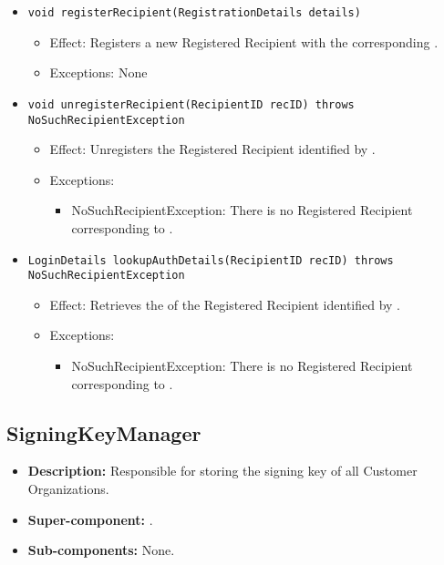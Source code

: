 \begin{itemize}
\begin{itemize}
		\item \texttt{void registerRecipient(RegistrationDetails details)}
        \begin{itemize}
            \item Effect: Registers a new Registered Recipient with the corresponding .
            \item Exceptions: None
        \end{itemize}

		\item \texttt{void unregisterRecipient(RecipientID recID) throws NoSuchRecipientException}
        \begin{itemize}
            \item Effect: Unregisters the Registered Recipient identified by .
            \item Exceptions:
			\begin{itemize}
				\item NoSuchRecipientException: There is no Registered Recipient corresponding to .
			\end{itemize}
        \end{itemize}

		\item \texttt{LoginDetails lookupAuthDetails(RecipientID recID) throws NoSuchRecipientException}
		    \begin{itemize}
                \item Effect: Retrieves the  of the Registered Recipient identified by .
                \item Exceptions:
				\begin{itemize}
					\item NoSuchRecipientException: There is no Registered Recipient corresponding to .
				\end{itemize}
            \end{itemize}
    \end{itemize}
\end{itemize}

\subsection{SigningKeyManager}
\begin{itemize}
    \item \textbf{Description:} Responsible for storing the signing key of all Customer Organizations.
    \item \textbf{Super-component:} .
    \item \textbf{Sub-components:} None.
\end{itemize}

